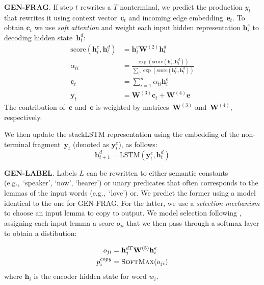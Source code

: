 \documentclass[11pt,a4paper]{article}
\theoremstyle{plain}
\begin{document}
\textbf{GEN-FRAG}. If step $t$ rewrites a $T$ nonterminal, we predict the production $y_t$ that rewrites it
using context vector~$\mathbf{c}_t$ and incoming edge
embedding~$\mathbf{e}_t$. To obtain $\mathbf{c}_t$ we use \textit{soft
  attention} \cite{luong2015effective} and weight each input hidden
representation $\mathbf{h}^{e}_i$ to decoding hidden
state~$\mathbf{h}_t^d$:\begin{equation}
\label{itemgenerator}
\begin{aligned}
  \textrm{score}(\mathbf{h}_i^e, \mathbf{h}_t^d) &= \mathbf{h}_i^e \mathbf{W}^{(2)} \mathbf{h}_t^d\\
  \alpha_{ti} &= \frac{\exp(\textrm{score}(\mathbf{h}_i^e, \mathbf{h}_t^d))}{\sum_{i'} \exp(\textrm{score}(\mathbf{h}_{i'}^e, \mathbf{h}_t^d))}\\
  \mathbf{c}_t &= \sum_{i=1}^n \alpha_{ti} \mathbf{h}_i^e\\
  \mathbf{y}_t &= \mathbf{W}^{(3)} \mathbf{c}_t + \mathbf{W}^{(4)} \mathbf{e}
\end{aligned}
\end{equation}
The contribution of~$\mathbf{c}$ and~$\mathbf{e}$ is weighted by matrices~$\mathbf{W}^{(3)}$ and~$\mathbf{W}^{(4)}$, respectively.

We then update the stackLSTM representation using the embedding of the
non-terminal fragment~$\mathbf{y}_t$ (denoted as $\mathbf{y}_{t}^{e}$), as follows:
\begin{equation}
    \label{lstmupdate}
    \mathbf{h}^{d}_{t+1} = \text{LSTM}(\mathbf{y}_{t}^{e}, \mathbf{h}^{d}_t)
\end{equation}

\textbf{GEN-LABEL}. Labels $L$ can be rewritten to either semantic constants (e.g.,~`speaker', `now',
`hearer') or unary predicates that often corresponds to the lemmas of the input words (e.g.,~`love')
or. We predict the former using a model identical to the 
one for GEN-FRAG. For the latter, we use a \textit{selection mechanism} to
choose an input lemma to copy to output. We model selection
following \citet{liu2018discourse}, assigning each
input lemma a score $o_{ji}$ that we then pass
through a softmax layer to obtain a distibution:

\begin{equation}
  \begin{aligned}
   o_{ji} &=\mathbf{h}_j^{dT}\mathbf{W}^{(5)}\mathbf{h}^{e}_{i}\\
   p_{i}^{copy} &= \textsc{SoftMax}(o_{ji})
  \end{aligned}
\end{equation}
where $\mathbf{h}_{i}$ is the encoder hidden state for word $w_i$.
\end{document}
